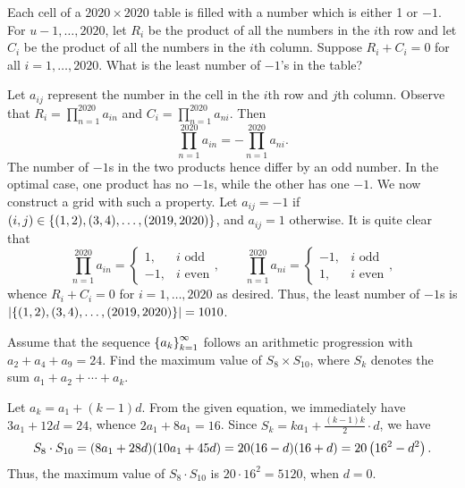 \begin{question}[1010]\label{A::2020-O-1-12}
    Each cell of a $2020 \times 2020$ table is filled with a number which is either 1 or $-1$. For $u - 1, \ldots, 2020$, let $R_i$ be the product of all the numbers in the $i$th row and let $C_i$ be the product of all the numbers in the $i$th column. Suppose $R_i + C_i = 0$ for all $i = 1, \ldots, 2020$. What is the least number of $-1$'s in the table?
\end{question}
\begin{solution*}
    Let $a_{ij}$ represent the number in the cell in the $i$th row and $j$th column. Observe that $R_i = \prod_{n = 1}^{2020} a_{in}$ and $C_i = \prod_{n=1}^{2020} a_{ni}$. Then \[\prod_{n = 1}^{2020} a_{in} = -\prod_{n=1}^{2020} a_{ni}.\] The number of $-1$s in the two products hence differ by an odd number. In the optimal case, one product has no $-1$s, while the other has one $-1$. We now construct a grid with such a property. Let $a_{ij} = -1$ if $(i, j) \in \left\lbrace (1, 2), (3, 4), \ldots, (2019, 2020) \right\rbrace$, and $a_{ij} = 1$ otherwise. It is quite clear that \[\prod_{n = 1}^{2020} a_{in} = \begin{cases}
        1, & i \text{ odd}\\
        -1, & i \text{ even}
    \end{cases}, \qquad \prod_{n = 1}^{2020} a_{ni} = \begin{cases}
        -1, & i \text{ odd}\\
        1, & i \text{ even}
    \end{cases},\] whence $R_i + C_i = 0$ for $i = 1, \ldots, 2020$ as desired. Thus, the least number of $-1$s is $\left\lvert \left\lbrace (1, 2), (3, 4), \ldots, (2019, 2020) \right\rbrace \right\rvert = 1010$.
\end{solution*}

\begin{question}[5120]\label{A::2020-O-1-13}
    Assume that the sequence $\left\lbrace a_k \right\rbrace_{k=1}^\infty$ follows an arithmetic progression with $a_2 + a_4 + a_9 = 24$. Find the maximum value of $S_8 \times S_{10}$, where $S_k$ denotes the sum $a_1 + a_2 + \cdots + a_k$.
\end{question}
\begin{solution*}
    Let $a_k = a_1 + (k-1)d$. From the given equation, we immediately have $3a_1 + 12d = 24$, whence $2a_1 + 8a_1 = 16$. Since $S_k = ka_1 + \frac{(k-1)k}2 \cdot d$, we have \[S_8 \cdot S_{10} = (8a_1 + 28d)(10a_1 + 45d) = 20(16 - d)(16 + d) = 20\left( 16^2 - d^2 \right).\] Thus, the maximum value of $S_8 \cdot S_{10}$ is $20 \cdot 16^2 = 5120$, when $d = 0$.
\end{solution*}

